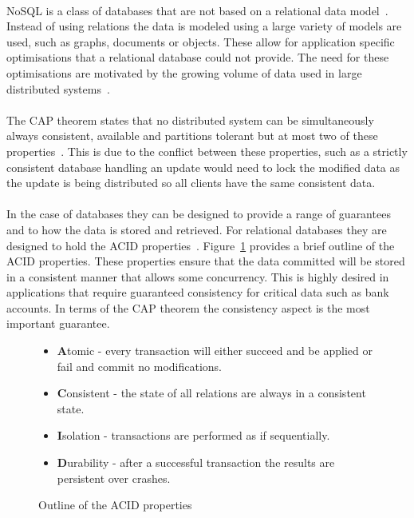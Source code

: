 \documentclass{CRPITStyle}
\renewcommand{\cite}{\citep}
\begin{document}
\paragraph{}
NoSQL is a class of databases that are not based on
a relational data model~\cite{nosql_db}.
Instead of using relations the data is modeled using a large
variety of models are used, such as graphs, documents or objects.
These allow for application specific optimisations that
a relational database could not provide.
The need for these optimisations are motivated by the growing
volume of data used in large distributed systems~\cite{nosql_db}.


\paragraph{}
The CAP theorem states that no distributed system can be
simultaneously always consistent, available and
partitions tolerant but at most two of these properties~\cite{base,nosql_db,compare_nosql}.
This is due to the conflict between these properties, such as a
strictly consistent database handling an update would
need to lock the modified data as the update is being distributed
so all clients have the same consistent data.

\paragraph{}
In the case of databases they can be designed to provide a
range of guarantees and to how the data is stored and retrieved.
For relational databases they are designed to hold
the ACID properties~\cite{relational_db,base}.
Figure~\ref{l:acid} provides a brief outline of the ACID properties.
These properties ensure that the data committed will be stored in a 
consistent manner that allows some concurrency.
This is highly desired in applications that require guaranteed consistency
for critical data such as bank accounts.
In terms of the CAP theorem the consistency aspect is the most important
guarantee.

\begin{figure}
\begin{itemize}
    \item \textbf{A}tomic - every transaction will either
        succeed and be applied or fail and commit no modifications.
    \item \textbf{C}onsistent - the state of all relations are
        always in a consistent state.
    \item \textbf{I}solation - transactions are performed as if sequentially.
    \item \textbf{D}urability - after a successful transaction the results
        are persistent over crashes.
\end{itemize}
    \caption{Outline of the ACID properties~\cite{relational_db,base}}\label{l:acid}
\end{figure}
%
\end{document}
